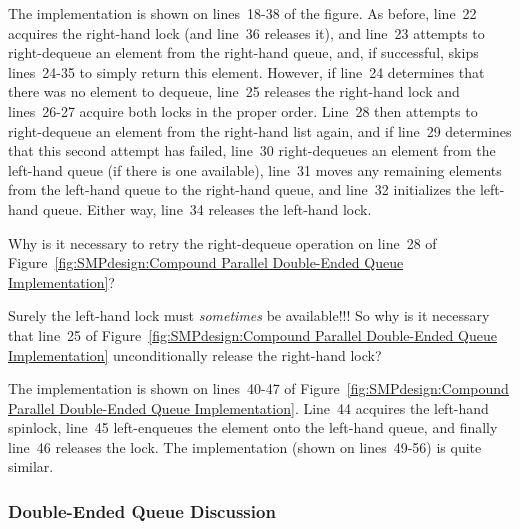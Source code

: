 The  implementation is shown on lines~18-38
of the figure.
As before, line~22 acquires the right-hand lock (and line~36
releases it), and line~23 attempts to right-dequeue an element
from the right-hand queue, and, if successful, skips lines~24-35
to simply return this element.
However, if line~24 determines that there was no element to dequeue,
line~25 releases the right-hand lock and lines~26-27 acquire both
locks in the proper order.
Line~28 then attempts to right-dequeue an element from the right-hand
list again, and if line~29 determines that this second attempt has
failed, line~30 right-dequeues an element from the left-hand queue
(if there is one available), line~31 moves any remaining elements
from the left-hand queue to the right-hand queue, and line~32
initializes the left-hand queue.
Either way, line~34 releases the left-hand lock.

\QuickQuiz{}
	Why is it necessary to retry the right-dequeue operation
	on line~28 of
	Figure~\ref{fig:SMPdesign:Compound Parallel Double-Ended Queue Implementation}?
 \QuickQuizEnd

\QuickQuiz{}
	Surely the left-hand lock must \emph{sometimes} be available!!!
	So why is it necessary that line~25 of
	Figure~\ref{fig:SMPdesign:Compound Parallel Double-Ended Queue Implementation}
	unconditionally release the right-hand lock?
 \QuickQuizEnd

The  implementation is shown on lines~40-47 of
Figure~\ref{fig:SMPdesign:Compound Parallel Double-Ended Queue Implementation}.
Line~44 acquires the left-hand spinlock, line~45 left-enqueues the
element onto the left-hand queue, and finally line~46 releases
the lock.
The  implementation (shown on lines~49-56)
is quite similar.

\subsubsection{Double-Ended Queue Discussion}
\label{sec:SMPdesign:Double-Ended Queue Discussion}

